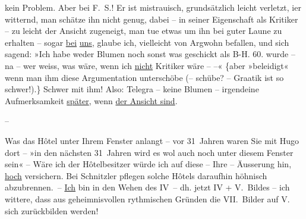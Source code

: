                kein Problem. Aber {\pb}bei F. S.! Er ist mistrauisch, grundsätzlich leicht
               verletzt, i{\geminationm}er witternd, man schätze ihn nicht  genug, dabei – in seiner Eigenschaft als Kritiker –
               zu leicht der Ansicht zugeneigt, man tue etwas um ihn bei guter Laune zu erhalten –
               sogar \uline{bei}{ }\uline{uns}, glaube ich, vielleicht von Argwohn befallen, und
               sich sagend: {\pb}»Ich habe weder
               Blumen noch sonst was geschickt als B-H. 60. wurde – na – wer weiss, was wäre, wenn
               ich \uline{nicht} Kritiker wäre – –« {\{}aber »beleidigt« wenn man ihm diese
               Argumentation unterschöbe (– schübe? – Gra{\geminationm}atik ist so
                  schwer!).{\}} Schwer mit ihm! Also: Telegra{\geminationm} – keine Blumen – irgendeine Aufmerksamkeit \uline{später}, wenn {\pb}\uline{\label{T_L02521-1v}\label{T_L02521-1} der Ansicht sind}.\pend
           
\pstart
           \numberlinefalse{}\centering{}–\numberlinetrue{}\pend
           
\pstart
           Was das Hôtel unter Ihrem Fenster anlangt – vor 31 Jahren \introOben{}waren
                  Sie\introOben{} mit Hugo dort – »in den nächsten
               31 Jahren \introOben{}wird es\introOben{} wol auch noch unter diesem Fenster \introOben{}sein\introOben{}« – Wäre ich der Hôtelbesitzer würde ich auf diese – Ihre
               – Äusserung hin, \uline{hoch} versichern. Bei Schnitzler
               pflegen solche Hôtels daraufhin {\pb}höhnisch abzubrennen. – \uline{Ich} bin in den Wehen des
                  IV – dh. jetzt IV + V. Bildes – ich wittere, dass  aus geheimnisvollen rythmischen Gründen die
               VII. Bilder auf V.  sich zurückbilden werden!\pend
           
